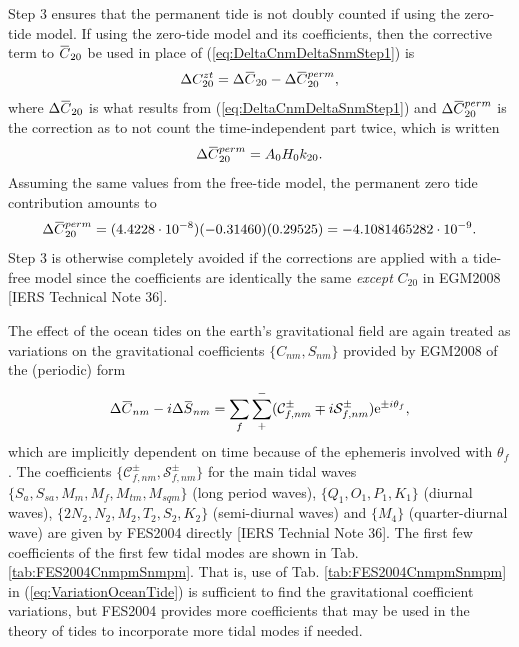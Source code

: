 \documentclass[11pt,dvipsnames]{thesis}
\newcommand{\overbar}[1]{\mkern 1.5mu\overline{\mkern-1.5mu#1\mkern-1.5mu}\mkern 1.5mu}
\begin{document}
Step 3 ensures that the permanent tide is not doubly counted if using the zero-tide model. If using the zero-tide model and its coefficients, then the corrective term to $\overbar{C}_{20}$ be used in place of (\ref{eq:DeltaCnmDeltaSnmStep1}) is
\begin{equation}
\Delta C_{20}^{zt} = \Delta\overbar{C}_{20} - \Delta\overbar{C}_{20}^{perm},
\end{equation}
where $\Delta\overbar{C}_{20}$ is what results from (\ref{eq:DeltaCnmDeltaSnmStep1}) and $\Delta\overbar{C}_{20}^{perm}$ is the correction as to not count the time-independent part twice, which is written
\begin{equation}
\Delta\overbar{C}_{20}^{perm} = A_0 H_0 k_{20}. \label{eq:ZeroTideC20Perm}
\end{equation}
Assuming the same values from the free-tide model, the permanent zero tide contribution amounts to
\begin{equation}
\Delta\overbar{C}_{20}^{perm} = (4.4228\cdot 10^{-8}) (-0.31460) (0.29525) = -4.1081465282 \cdot 10^{-9}.
\end{equation}
Step 3 is otherwise completely avoided if the corrections are applied with a tide-free model since the coefficients are identically the same \textit{except} $C_{20}$ in EGM2008 [IERS Technical Note 36].

The effect of the ocean tides on the earth's gravitational field are again treated as variations on the gravitational coefficients $\{C_{nm}, S_{nm}\}$ provided by EGM2008 of the (periodic) form
\begin{equation}
\Delta\overbar{C}_{nm} - i \Delta\overbar{S}_{nm} = \sum_f \sum_+^- (\mathcal{C}_{f,nm}^{\pm} \mp i \mathcal{S}_{f,nm}^{\pm}) \mathrm{e}^{\pm i \theta_f}, \label{eq:VariationOceanTide}
\end{equation}
which are implicitly dependent on time because of the ephemeris involved with $\theta_f$. The coefficients $\{\mathcal{C}_{f,nm}^{\pm}, \mathcal{S}_{f,nm}^{\pm}\}$ for the main tidal waves $\{S_a, S_{sa}, M_m, M_f, M_{tm}, M_{sqm}\}$ (long period waves), $\{Q_1, O_1, P_1, K_1\}$ (diurnal waves), $\{2N_2, N_2, M_2, T_2, S_2, K_2\}$ (semi-diurnal waves) and $\{M_4\}$ (quarter-diurnal wave) are given by FES2004 directly [IERS Technial Note 36]. The first few coefficients of the first few tidal modes are shown in Tab. \ref{tab:FES2004CnmpmSnmpm}.
That is, use of Tab. \ref{tab:FES2004CnmpmSnmpm} in (\ref{eq:VariationOceanTide}) is sufficient to find the gravitational coefficient variations, but FES2004 provides more coefficients that may be used in the theory of tides to incorporate more tidal modes if needed.
\end{document}
